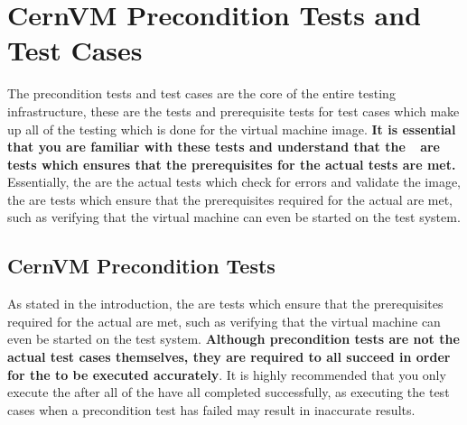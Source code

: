 \chapter{CernVM Precondition Tests and Test Cases}
\label{sec:cernvmtests}

The \cernvm precondition tests and test cases are the core of the entire testing infrastructure, these are
the tests and prerequisite tests for test cases which make up all of the testing which is done for the
virtual machine image. {\bf It is essential that you are familiar with these tests and understand that the}
\pretest~ {\bf are tests which ensures that the prerequisites for the actual tests are met.}
Essentially, the \testcase are the actual tests which check for errors and validate the \cernvm image, the
\pretest are tests which ensure that the prerequisites required for the actual \testcase are met, such as
verifying that the virtual machine can even be started on the test system.


\section{CernVM Precondition Tests}
\label{sec:cernvmpretests}

As stated in the introduction, the \pretest are tests which ensure that the prerequisites required for the
actual \testcase are met, such as verifying that the virtual machine can even be started on the test system.
{\bf Although precondition tests are not the actual test cases themselves, they are required to all succeed
in order for the \testcase to be executed accurately}. It is highly recommended that you only execute
the \testcase after all of the \pretest have all completed successfully, as executing the test cases when
a precondition test has failed may result in inaccurate results.

